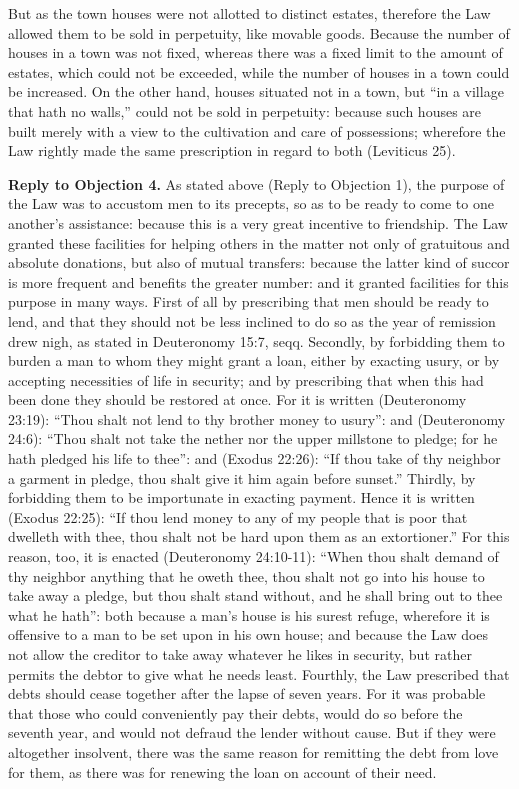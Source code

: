 But as the town houses were not allotted to distinct estates, therefore the Law allowed them to be sold in perpetuity, like movable goods. Because the number of houses in a town was not fixed, whereas there was a fixed limit to the amount of estates, which could not be exceeded, while the number of houses in a town could be increased. On the other hand, houses situated not in a town, but ``in a village that hath no walls,'' could not be sold in perpetuity: because such houses are built merely with a view to the cultivation and care of possessions; wherefore the Law rightly made the same prescription in regard to both (Leviticus 25).

\textbf{Reply to Objection 4.} As stated above (Reply to Objection 1), the purpose of the Law was to accustom men to its precepts, so as to be ready to come to one another's assistance: because this is a very great incentive to friendship. The Law granted these facilities for helping others in the matter not only of gratuitous and absolute donations, but also of mutual transfers: because the latter kind of succor is more frequent and benefits the greater number: and it granted facilities for this purpose in many ways. First of all by prescribing that men should be ready to lend, and that they should not be less inclined to do so as the year of remission drew nigh, as stated in Deuteronomy 15:7, seqq. Secondly, by forbidding them to burden a man to whom they might grant a loan, either by exacting usury, or by accepting necessities of life in security; and by prescribing that when this had been done they should be restored at once. For it is written (Deuteronomy 23:19): ``Thou shalt not lend to thy brother money to usury'': and (Deuteronomy 24:6): ``Thou shalt not take the nether nor the upper millstone to pledge; for he hath pledged his life to thee'': and (Exodus 22:26): ``If thou take of thy neighbor a garment in pledge, thou shalt give it him again before sunset.'' Thirdly, by forbidding them to be importunate in exacting payment. Hence it is written (Exodus 22:25): ``If thou lend money to any of my people that is poor that dwelleth with thee, thou shalt not be hard upon them as an extortioner.'' For this reason, too, it is enacted (Deuteronomy 24:10-11): ``When thou shalt demand of thy neighbor anything that he oweth thee, thou shalt not go into his house to take away a pledge, but thou shalt stand without, and he shall bring out to thee what he hath'': both because a man's house is his surest refuge, wherefore it is offensive to a man to be set upon in his own house; and because the Law does not allow the creditor to take away whatever he likes in security, but rather permits the debtor to give what he needs least. Fourthly, the Law prescribed that debts should cease together after the lapse of seven years. For it was probable that those who could conveniently pay their debts, would do so before the seventh year, and would not defraud the lender without cause. But if they were altogether insolvent, there was the same reason for remitting the debt from love for them, as there was for renewing the loan on account of their need.

